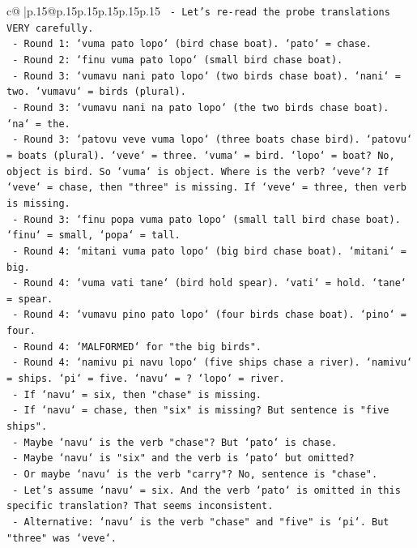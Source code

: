 \documentclass{article}
\begin{document}
{\begin{supertabular}{c@{$\;$}|p{.15\linewidth}@{}p{.15\linewidth}p{.15\linewidth}p{.15\linewidth}p{.15\linewidth}p{.15\linewidth}}
{{{\texttt{  {-} Let's re{-}read the probe translations VERY carefully.} \\
\texttt{  {-} Round 1: `vuma pato lopo` (bird chase boat). `pato` = chase.} \\
\texttt{  {-} Round 2: `finu vuma pato lopo` (small bird chase boat).} \\
\texttt{  {-} Round 3: `vumavu nani pato lopo` (two birds chase boat). `nani` = two. `vumavu` = birds (plural).} \\
\texttt{  {-} Round 3: `vumavu nani na pato lopo` (the two birds chase boat). `na` = the.} \\
\texttt{  {-} Round 3: `patovu veve vuma lopo` (three boats chase bird). `patovu` = boats (plural). `veve` = three. `vuma` = bird. `lopo` = boat? No, object is bird. So `vuma` is object. Where is the verb? `veve`? If `veve` = chase, then "three" is missing. If `veve` = three, then verb is missing.} \\
\texttt{  {-} Round 3: `finu popa vuma pato lopo` (small tall bird chase boat). `finu` = small, `popa` = tall.} \\
\texttt{  {-} Round 4: `mitani vuma pato lopo` (big bird chase boat). `mitani` = big.} \\
\texttt{  {-} Round 4: `vuma vati tane` (bird hold spear). `vati` = hold. `tane` = spear.} \\
\texttt{  {-} Round 4: `vumavu pino pato lopo` (four birds chase boat). `pino` = four.} \\
\texttt{  {-} Round 4: `MALFORMED` for "the big birds".} \\
\texttt{  {-} Round 4: `namivu pi navu lopo` (five ships chase a river). `namivu` = ships. `pi` = five. `navu` = ? `lopo` = river.} \\
\texttt{    {-} If `navu` = six, then "chase" is missing.} \\
\texttt{    {-} If `navu` = chase, then "six" is missing? But sentence is "five ships".} \\
\texttt{    {-} Maybe `navu` is the verb "chase"? But `pato` is chase.} \\
\texttt{    {-} Maybe `navu` is "six" and the verb is `pato` but omitted?} \\
\texttt{    {-} Or maybe `navu` is the verb "carry"? No, sentence is "chase".} \\
\texttt{    {-} Let's assume `navu` = six. And the verb `pato` is omitted in this specific translation? That seems inconsistent.} \\
\texttt{    {-} Alternative: `navu` is the verb "chase" and "five" is `pi`. But "three" was `veve`.} \\
}}}
\end{supertabular}}
\end{document}
